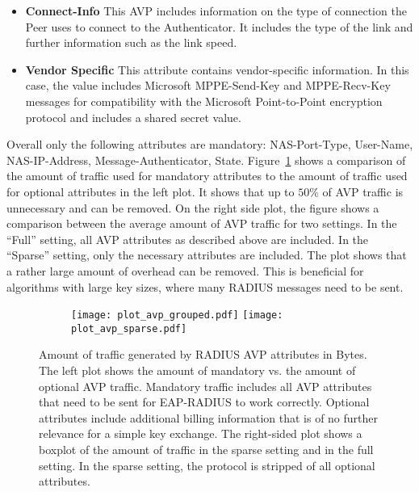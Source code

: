\begin{itemize}
    \item \textbf{Connect-Info} This AVP includes information on the type of connection the Peer uses to connect to the Authenticator. It includes the type of the link and further information such as the link speed\cite{rfc2869}.
    \item \textbf{Vendor Specific} This attribute contains vendor-specific information. In this case, the value includes Microsoft MPPE-Send-Key and MPPE-Recv-Key messages for compatibility with the Microsoft Point-to-Point encryption protocol and includes a shared secret value\cite{rfc2548}.
\end{itemize}

Overall only the following attributes are mandatory: NAS-Port-Type, User-Name, NAS-IP-Address, Message-Authenticator, State. Figure~\ref{fig:plot_avp_grouped.pdf} shows a comparison of the amount of traffic used for mandatory attributes to the amount of traffic used for optional attributes in the left plot. It shows that up to \(50\%\) of AVP traffic is unnecessary and can be removed. On the right side plot, the figure shows a comparison between the average amount of AVP traffic for two settings. In the ``Full'' setting, all AVP attributes as described above are included. In the ``Sparse'' setting, only the necessary attributes are included. The plot shows that a rather large amount of overhead can be removed. This is beneficial for algorithms with large key sizes, where many RADIUS messages need to be sent.

\begin{figure}[t]
    \begin{subfigure}{\linewidth}
        \texttt{[image: plot\_avp\_grouped.pdf]}
        \texttt{[image: plot\_avp\_sparse.pdf]}
    \end{subfigure}\caption{Amount of traffic generated by RADIUS AVP attributes in Bytes. The left plot shows the amount of mandatory vs. the amount of optional AVP traffic. Mandatory traffic includes all AVP attributes that need to be sent for EAP-RADIUS to work correctly. Optional attributes include additional billing information that is of no further relevance for a simple key exchange. The right-sided plot shows a boxplot of the amount of traffic in the sparse setting and in the full setting. In the sparse setting, the protocol is stripped of all optional attributes.}\label{fig:plot_avp_grouped.pdf}
\end{figure}

